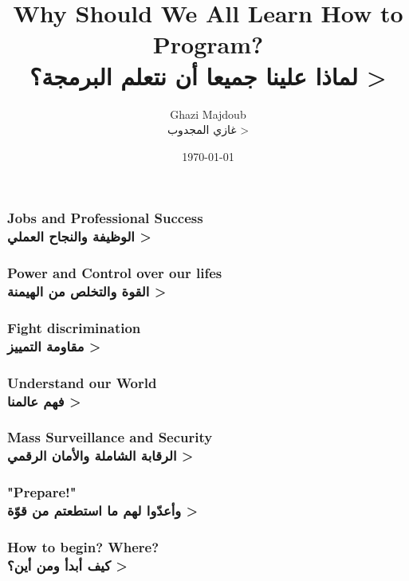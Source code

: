 \documentclass{beamer}
\begin{document}

\title{		Why Should We All Learn How to Program?\\ 
			\<
			لماذا علينا جميعا أن نتعلم البرمجة؟
			>
} %
\author{	Ghazi Majdoub\\
			\< 
			غازي المجدوب
			>
}
\date{\today}

	\begin{frame}
		\titlepage
	\end{frame}
	
	\begin{frame}
		\frametitle{Jobs and Professional Success\\
		\<
		الوظيفة والنجاح العملي
		>
		}
	\end{frame}
	
	\begin{frame}
		\frametitle{Power and Control over our lifes\\
		\<
		القوة والتخلص من الهيمنة
		>
		}
	\end{frame}
	
	\begin{frame}
		\frametitle{Fight discrimination\\
		\<
		مقاومة التمييز
		>
		}
	\end{frame}
	
	\begin{frame}
		\frametitle{Understand our World\\
		\<
		فهم عالمنا
		>
		}
	\end{frame}
	
	\begin{frame}
		\frametitle{Mass Surveillance and Security\\
		\<
		الرقابة الشاملة والأمان الرقمي
		>
		}
	\end{frame}
	
	\begin{frame}
		\frametitle{"Prepare!"\\
		\<
		وأعدّوا لهم ما استطعتم من قوّة
		>
		}
	\end{frame}
	
	\begin{frame}
		\frametitle{How to begin? Where?\\
		\<
		كيف أبدأ ومن أين؟
		>
		}
	\end{frame}
	
\end{document}
